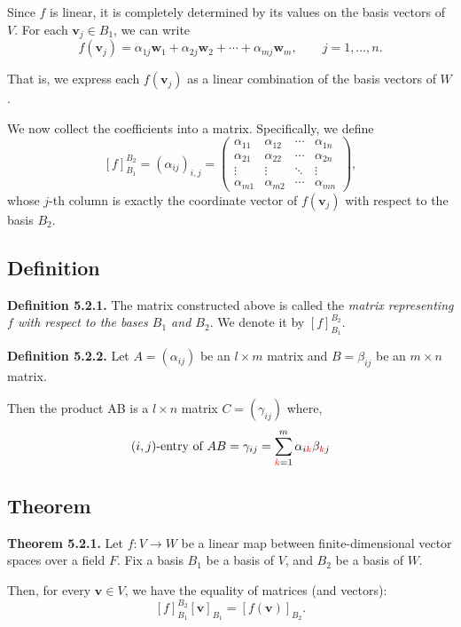 \documentclass[12pt]{article}
\begin{document}
\medskip

Since $f$ is linear, it is completely determined by its values on the basis vectors of $V$. For each $\mathbf{v}_j\in B_1$, we can write
\[
f(\mathbf{v}_j)=\alpha_{1j}\mathbf{w}_1+\alpha_{2j}\mathbf{w}_2+\cdots+\alpha_{mj}\mathbf{w}_m,\qquad j=1,\ldots,n.
\]

That is, we express each $f(\mathbf{v}_j)$ as a linear combination of the basis vectors of $W$.

\medskip

We now collect the coefficients into a matrix. Specifically, we define
\[
[f]_{B_1}^{B_2}=(\alpha_{ij})_{i,j}=
\begin{pmatrix}
\alpha_{11} & \alpha_{12} & \cdots & \alpha_{1n}\\
\alpha_{21} & \alpha_{22} & \cdots & \alpha_{2n}\\
\vdots      & \vdots      & \ddots & \vdots\\
\alpha_{m1} & \alpha_{m2} & \cdots & \alpha_{mn}
\end{pmatrix},
\]
whose $j$-th column is exactly the coordinate vector of $f(\mathbf{v}_j)$ with respect to the basis $B_2$.

\subsection{Definition}

\textbf{Definition 5.2.1.}
The matrix constructed above is called the \emph{matrix representing
$f$ with respect to the bases $B_1$ and $B_2$}. We denote it by $[f]_{B_1}^{B_2}$.

\textbf{Definition 5.2.2.}
Let $A = (\alpha_{ij})$ be an $l\times m$ matrix and $B = \beta_{ij}$ be an $m \times n$ matrix.

Then the product AB is a $l \times n$ matrix $C = (\gamma_{ij})$ where,
\[
(i,j)\text{-entry of }AB = \gamma_{ij} = \sum_{\textcolor{red}{k}=1}^{m} \alpha_{i\textcolor{red}{k}}\beta_{\textcolor{red}{k}j}
\]

\subsection{Theorem}

\textbf{Theorem 5.2.1.}
Let $f:V\to W$ be a linear map between finite-dimensional vector spaces over a field $F$.
Fix a basis $B_1$ be a basis of $V$, and $B_2$ be a basis of $W$.

Then, for every $\mathbf{v}\in V$, we have the equality of matrices (and vectors):
\[
[f]_{B_1}^{B_2}[\mathbf{v}]_{B_1}=[f(\mathbf{v})]_{B_2}.
\]
\end{document}

